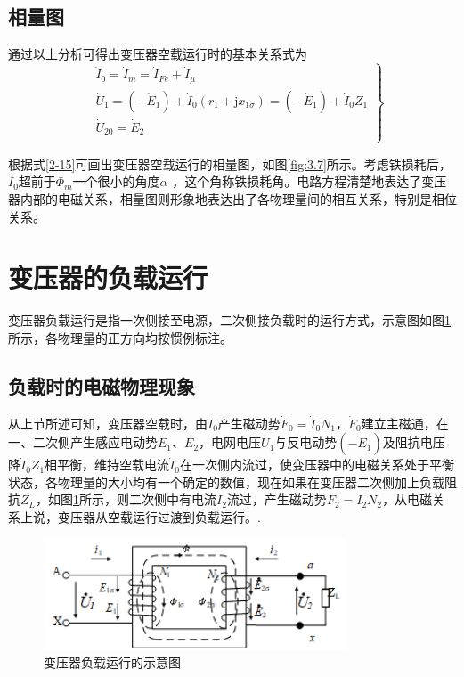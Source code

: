 \documentclass{book}
\begin{document}
\subsection{相量图}
通过以上分析可得出变压器空载运行时的基本关系式为
\begin{equation}
\left. \begin{aligned}
& {{{\dot{I}}}_{0}}={{{\dot{I}}}_{m}}={{{\dot{I}}}_{Fe}}+{{{\dot{I}}}_{\mu }} \\ 
& {{{\dot{U}}}_{1}}=\left( -{{{\dot{E}}}_{1}} \right)+{{{\dot{I}}}_{0}}\left( {{r}_{1}}+\text{j}{{x}_{1\sigma }} \right)=\left( -{{{\dot{E}}}_{1}} \right)+{{{\dot{I}}}_{0}}{{Z}_{1}} \\ 
& {{{\dot{U}}}_{20}}={{{\dot{E}}}_{2}} \\ 
\end{aligned} \right\}
\label{2-15}
\end{equation}

根据式\eqref{2-15}可画出变压器空载运行的相量图，如图\ref{fig:3.7}所示。考虑铁损耗后，${{\dot{I}}_{0}}$超前于${{\dot{\Phi }}_{m}}$一个很小的角度$\alpha $ ，这个角称铁损耗角。电路方程清楚地表达了变压器内部的电磁关系，相量图则形象地表达出了各物理量间的相互关系，特别是相位关系。

\section{变压器的负载运行}

变压器负载运行是指一次侧接至电源，二次侧接负载时的运行方式，示意图如图\ref{fig_3.8}所示，各物理量的正方向均按惯例标注。

\subsection{负载时的电磁物理现象}
从上节所述可知，变压器空载时，由${{\dot{I}}_{0}}$产生磁动势${{\dot{F}}_{0}}={{\dot{I}}_{0}}{{N}_{1}}$，${{\dot{F}}_{0}}$建立主磁通，在一、二次侧产生感应电动势${{\dot{E}}_{1}}$、${{\dot{E}}_{2}}$，电网电压${{\dot{U}}_{1}}$与反电动势$\left( -{{{\dot{E}}}_{1}} \right)$及阻抗电压降${{\dot{I}}_{0}}{{Z}_{1}}$相平衡，维持空载电流${{\dot{I}}_{0}}$在一次侧内流过，使变压器中的电磁关系处于平衡状态，各物理量的大小均有一个确定的数值，现在如果在变压器二次侧加上负载阻抗${{Z}_{L}}$，如图\ref{fig_3.8}所示，则二次侧中有电流${{\dot{I}}_{2}}$流过，产生磁动势${{\dot{F}}_{2}}={{\dot{I}}_{2}}{{N}_{2}}$，从电磁关系上说，变压器从空载运行过渡到负载运行。.
\begin{figure}[H]
	\centering
	\includegraphics[width=0.80\textwidth]{3-8g.png}
	\caption{变压器负载运行的示意图}
	\label{fig_3.8}
\end{figure}
\end{document}
